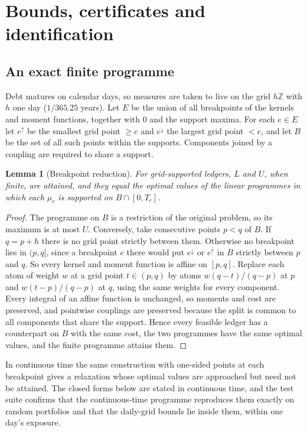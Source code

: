 \documentclass[11pt,a4paper]{article}
\newtheorem{lemma}[proposition]{Lemma}
\theoremstyle{remark}
\begin{document}
\section{Bounds, certificates and identification}\label{sec:theory}

\subsection{An exact finite programme}

Debt matures on calendar days, so measures are taken to live on the grid $h\mathbb{Z}$ with $h$ one day ($1/365.25$ years). Let $E$ be the union of all breakpoints of the kernels and moment functions, together with $0$ and the support maxima. For each $e\in E$ let $e^\uparrow$ be the smallest grid point $\ge e$ and $e^\downarrow$ the largest grid point $<e$, and let $B$ be the set of all such points within the supports. Components joined by a coupling are required to share a support.

\begin{lemma}[Breakpoint reduction]\label{lem:breakpoint}
For grid-supported ledgers, $L$ and $U$, when finite, are attained, and they equal the optimal values of the linear programmes in which each $\mu_c$ is supported on $B\cap[0,T_c]$.
\end{lemma}
\begin{proof}
The programme on $B$ is a restriction of the original problem, so its maximum is at most $U$. Conversely, take consecutive points $p<q$ of $B$. If $q=p+h$ there is no grid point strictly between them. Otherwise no breakpoint lies in $(p,q]$, since a breakpoint $e$ there would put $e^\downarrow$ or $e^\uparrow$ in $B$ strictly between $p$ and $q$. So every kernel and moment function is affine on $[p,q]$. Replace each atom of weight $w$ at a grid point $t\in(p,q)$ by atoms $w(q-t)/(q-p)$ at $p$ and $w(t-p)/(q-p)$ at $q$, using the same weights for every component. Every integral of an affine function is unchanged, so moments and cost are preserved, and pointwise couplings are preserved because the split is common to all components that share the support. Hence every feasible ledger has a counterpart on $B$ with the same cost, the two programmes have the same optimal values, and the finite programme attains them.
\end{proof}

In continuous time the same construction with one-sided points at each breakpoint gives a relaxation whose optimal values are approached but need not be attained. The closed forms below are stated in continuous time, and the test suite confirms that the continuous-time programme reproduces them exactly on random portfolios and that the daily-grid bounds lie inside them, within one day's exposure.
\end{document}
